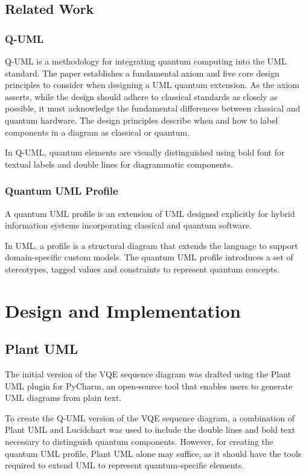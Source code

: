 \documentclass{article}
\begin{document}
\subsection{Related Work}

\subsubsection{Q-UML}

Q-UML is a methodology for integrating quantum computing into the UML standard. The paper establishes a fundamental axiom and five core design principles to consider when designing a UML quantum extension. As the axiom asserts, while the design should adhere to classical standards as closely as possible, it must acknowledge the fundamental differences between classical and quantum hardware. The design principles describe when and how to label components in a diagram as classical or quantum.

In Q-UML, quantum elements are visually distinguished using bold font for textual labels and double lines for diagrammatic components. 

\subsubsection{Quantum UML Profile}

A quantum UML profile is an extension of UML designed explicitly for hybrid information systems incorporating classical and quantum software.

In UML, a profile is a structural diagram that extends the language to support domain-specific custom models. The quantum UML profile introduces a set of stereotypes, tagged values and constraints to represent quantum concepts. 

\section{Design and Implementation}
\subsection{Plant UML}

The initial version of the VQE sequence diagram was drafted using the Plant UML plugin for PyCharm, an open-source tool that enables users to generate UML diagrams from plain text.

To create the Q-UML version of the VQE sequence diagram, a combination of Plant UML and Lucidchart was used to include the double lines and bold text necessary to distinguish quantum components. However, for creating the quantum UML profile, Plant UML alone may suffice, as it should have the tools required to extend UML to represent quantum-specific elements. 
\end{document}
